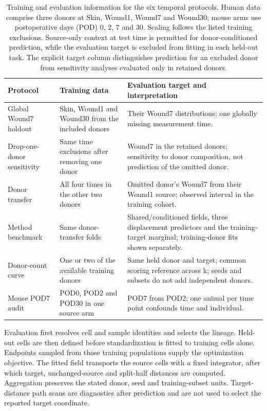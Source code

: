 \documentclass[10pt,a4paper]{article}
\begin{document}
\begin{table}[!htbp]\centering\small
\caption{Training and evaluation information for the six temporal protocols. Human data comprise three donors at Skin, Wound1, Wound7 and Wound30; mouse arms use postoperative days (POD) 0, 2, 7 and 30. Scaling follows the listed training exclusions. Source-only context at test time is permitted for donor-conditioned prediction, while the evaluation target is excluded from fitting in each held-out task. The explicit target column distinguishes prediction for an excluded donor from sensitivity analyses evaluated only in retained donors.}\label{tab:p2protocols}
\begin{tabularx}{\linewidth}{@{}p{36mm}LL@{}}\toprule
Protocol & Training data & Evaluation target and interpretation \\\midrule
Global Wound7 holdout & Skin, Wound1 and Wound30 from the included donors & Their Wound7 distributions; one globally missing measurement time. \\
Drop-one-donor sensitivity & Same time exclusions after removing one donor & Wound7 in the retained donors; sensitivity to donor composition, not prediction of the omitted donor. \\
Donor transfer & All four times in the other two donors & Omitted donor's Wound7 from their Wound1 source; observed interval in the training cohort. \\
Method benchmark & Same donor-transfer folds & Shared/conditioned fields, three displacement predictors and the training-target marginal; training-donor fits shown separately. \\
Donor-count curve & One or two of the available training donors & Same held donor and target; common scoring reference across k; seeds and subsets do not add independent donors. \\
Mouse POD7 audit & POD0, POD2 and POD30 in one source arm & POD7 from POD2; one animal per time point confounds time and individual. \\\bottomrule
\end{tabularx}\end{table}

Evaluation first resolves cell and sample identities and selects the lineage. Held-out cells are then defined before standardization is fitted to training cells alone. Endpoints sampled from those training populations supply the optimization objective. The fitted field transports the source cells with a fixed integrator, after which target, unchanged-source and split-half distances are computed. Aggregation preserves the stated donor, seed and training-subset units. Target-distance path scans are diagnostics after prediction and are not used to select the reported target coordinate.
\end{document}
